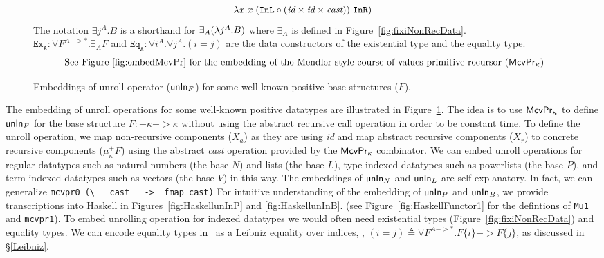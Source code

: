 {\begin{landscape}
\begin{figure}
\[\lambda x. x \;(\texttt{InL}\circ
		(\textit{id}\times\textit{id}\times\textit{cast}))
	\;\texttt{InR})
\]
The notation $\exists j^A.B$ is a shorthand for $\exists_A(\lambda j^A.B)$
where $\exists_A$ is defined in Figure~\ref{fig:fixiNonRecData}.\\
$\mathtt{Ex_{A}} : \forall F^{A -> *}.\exists_A F$ and
$\mathtt{Eq_{A}} : \forall i^A.\forall j^A.(i=j)$ are
the data constructors of the existential type and the equality type.
\[\text{
See Figure \ref{fig:embedMcvPr} for the embedding of the Mendler-style
course-of-values primitive recursor ($\mathsf{McvPr}_\kappa$)}
\]
\caption{Embeddings of unroll operator ($\mathsf{unIn}_F$)
	for some well-known positive base structures ($F$).}
\label{fig:unInExamples}
\end{figure}

\end{landscape}
} %

The embedding of unroll operations for some well-known positive datatypes
are illustrated in Figure~\ref{fig:unInExamples}. The idea is to use
$\mathsf{McvPr}_\kappa$ to define $\mathsf{unIn}_F$ for the base structure
$F:+\kappa -> \kappa$ without using the abstract recursive call operation
in order to be constant time. To define the unroll operation, we map
non-recursive components ($X_a$) as they are using \textit{id} and map
abstract recursive components ($X_r$) to concrete recursive components
($\mu^{+}_\kappa F$) using the abstract \textit{cast} operation provided
by the $\mathsf{McvPr}_\kappa$ combinator. We can embed unroll operations
for regular datatypes such as natural numbers (the base $N$) and lists
(the base $L$), type-indexed datatypes such as powerlists (the base $P$),
and term-indexed datatypes such as vectors (the base $V$) in this way.
The embeddings of $\mathsf{unIn}_N$ and $\mathsf{unIn}_L$ are self explanatory.
In fact, we can generalize \lstinline$mcvpr0 (\ _ cast _ ->  fmap cast)$
For intuitive understanding of the embedding of $\mathsf{unIn}_P$ and $\mathsf{unIn}_B$,
we provide transcriptions into Haskell in Figures~\ref{fig:HaskellunInP}
and \ref{fig:HaskellunInB}.
(see Figure~\ref{fig:HaskellFunctor1} for the defintions of \texttt{Mu1} and
\texttt{mcvpr1}). To embed unrolling operation for indexed datatypes we would
often need existential types (Figure~\ref{fig:fixiNonRecData}) and
equality types. We can encode equality types in \Fixi\ as a Leibniz equality
over indices, \ie, $(i=j) \triangleq \forall F^{A -> *}.F\{i\} -> F\{j\}$,
as discussed in \S\ref{Leibniz}.

